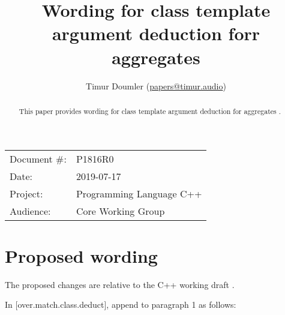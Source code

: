 

\newcommand{\forceindent}{\parindent=1em\indent\parindent=0pt\relax} %



\title{Wording for class template argument deduction forr aggregates}
\author{
  Timur Doumler \small(\href{mailto:papers@timur.audio}{papers@timur.audio})
}
\date{}
\maketitle

\begin{tabular}{ll}
Document \#: & P1816R0 \\
Date: & 2019-07-17\\
Project: & Programming Language C++ \\
Audience: & Core Working Group
\end{tabular}


\begin{abstract}
This paper provides wording for class template argument deduction for aggregates \cite{P1021R4}.
\end{abstract}

\section{Proposed wording}

The proposed changes are relative to the C++ working draft \cite{N4820}. 

In [over.match.class.deduct], append to paragraph 1 as follows:

